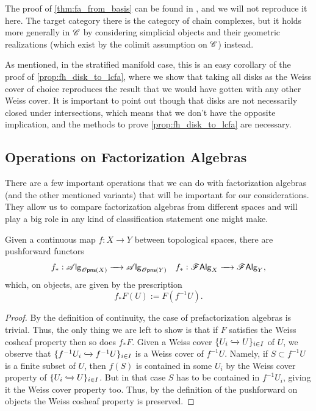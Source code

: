 \documentclass[../text]{subfiles}
\begin{document}
\begin{remark}
    The proof of \cref{thm:fa_from_basis} can be found in \cite[ch.7.2]{cg2016}, and we will not reproduce it here. The target category there is the category of chain complexes, but it holds more generally in $\mathscr{C}$ by considering simplicial objects and their geometric realizations (which exist by the colimit assumption on $\mathscr{C}$) instead.
    
    As mentioned, in the stratified manifold case, this is an easy corollary of the proof of \cref{prop:fh_disk_to_lcfa}, where we show that taking all disks as the Weiss cover of choice reproduces the result that we would have gotten with any other Weiss cover. It is important to point out though that disks are not necessarily closed under intersections, which means that we don't have the opposite implication, and the methods to prove \cref{prop:fh_disk_to_lcfa} are necessary.
\end{remark}


\subsection{Operations on Factorization Algebras}

There are a few important operations that we can do with factorization algebras (and the other mentioned variants) that will be important for our considerations. They allow us to compare factorization algebras from different spaces and will play a big role in any kind of classification statement one might make.


\begin{proposition}\label{prop:pushforward}
    Given a continuous map $f:X \rightarrow Y$ between topological spaces, there are pushforward functors
    \begin{align}
        &f_*: \alg{\opens[s](X)} \xrightarrow{\quad} \alg{\opens[s](Y)} &f_*: \falg_X \xrightarrow{\quad} \falg_Y,
    \end{align}
    which, on objects, are given by the prescription
    \begin{equation}
        f_*F (U) := F(f^{-1}U).
    \end{equation}
\end{proposition}

\begin{proof}
    By the definition of continuity, the case of prefactorization algebras is trivial. Thus, the only thing we are left to show is that if $F$ satisfies the Weiss cosheaf property then so does $f_* F$. Given a Weiss cover $\{U_i \xhookrightarrow{} U\}_{i \in I}$ of $U$, we observe that $\{f^{-1}U_i \xhookrightarrow{} f^{-1}U\}_{i \in I}$ is a Weiss cover of $f^{-1}U$. Namely, if $S \subset f^{-1}U$ is a finite subset of $U$, then $f(S)$ is contained in some $U_i$ by the Weiss cover property of $\{U_i \xhookrightarrow{} U\}_{i \in I}$. But in that case $S$ has to be contained in $f^{-1}U_i$, giving it the Weiss cover property too. Thus, by the definition of the pushforward on objects the Weiss cosheaf property is preserved.
\end{proof}
\end{document}
